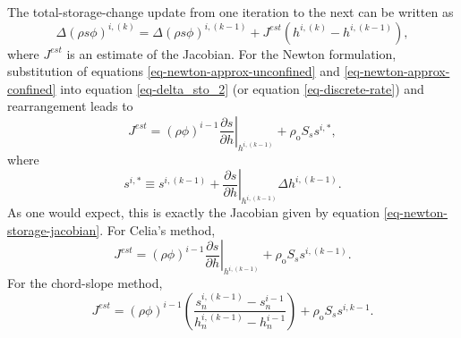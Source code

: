 \documentclass[fleqn]{article}
\begin{document}
The total-storage-change update from one iteration to the next can be written as
\begin{equation}
  \Delta \left ( \rho s \phi \right )^{i,(k)} = \Delta \left ( \rho s \phi \right )^{i,(k-1)} +
  J^{est} \left ( h^{i,(k)} - h^{i,(k-1)} \right ) ,
  \label{eq-delta_sto_update}
\end{equation}
where $J^{est}$ is an estimate of the Jacobian. For the Newton formulation, substitution of equations \ref{eq-newton-approx-unconfined} and \ref{eq-newton-approx-confined} into equation \ref{eq-delta_sto_2} (or equation \ref{eq-discrete-rate}) and rearrangement leads to
\begin{equation}
  J^{est} = (\rho \phi)^{i-1} \left. \frac{\partial s}{\partial h}\right|_{h^{i,(k-1)}} +
  \rho_{\textrm{o}} S_s s^{i,*} ,
  \label{eq-jest-newton}
\end{equation}
where
\begin{equation}
  s^{i,*} \equiv  s^{i,(k-1)} + \left. \frac{\partial s}{\partial h}\right|_{h^{i,(k-1)}}
  \Delta h^{i,(k-1)} .
\end{equation}
As one would expect, this is exactly the Jacobian given by equation \ref{eq-newton-storage-jacobian}. For Celia's method,
\begin{equation}
  J^{est} = (\rho \phi)^{i-1} \left. \frac{\partial s}{\partial h}\right|_{h^{i,(k-1)}} +
  \rho_{\textrm{o}} S_s s^{i,(k-1)} .
  \label{eq-jest-celia}
\end{equation}
For the chord-slope method,
\begin{equation}
  J^{est} = (\rho \phi)^{i-1}
  \left( \frac{s_n^{i,(k-1)} - s_n^{i-1}}{h_n^{i,(k-1)} - h_n^{i-1}} \right) +
  \rho_{\textrm{o}} S_s s^{i,k-1} .
  \label{eq-jest-chord-slope}
\end{equation}
\end{document}
